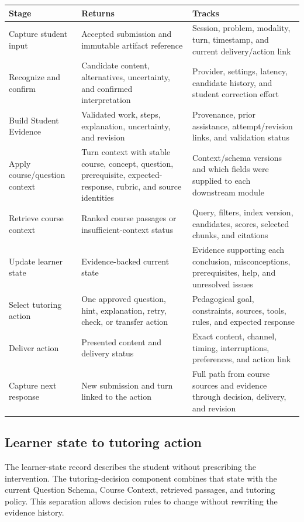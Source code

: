 \documentclass[11pt]{article}
\begin{document}
\noindent\begin{tabularx}{\textwidth}{@{}p{}p{}X@{}}
\toprule
\textbf{Stage} & \textbf{Returns} & \textbf{Tracks} \\
\midrule
Capture student input & Accepted submission and immutable artifact reference & Session, problem, modality, turn, timestamp, and current delivery/action link \\
Recognize and confirm & Candidate content, alternatives, uncertainty, and confirmed interpretation & Provider, settings, latency, candidate history, and student correction effort \\
Build Student Evidence & Validated work, steps, explanation, uncertainty, and revision & Provenance, prior assistance, attempt/revision links, and validation status \\
Apply course/question context & Turn context with stable course, concept, question, prerequisite, expected-response, rubric, and source identities & Context/schema versions and which fields were supplied to each downstream module \\
Retrieve course context & Ranked course passages or insufficient-context status & Query, filters, index version, candidates, scores, selected chunks, and citations \\
Update learner state & Evidence-backed current state & Evidence supporting each conclusion, misconceptions, prerequisites, help, and unresolved issues \\
Select tutoring action & One approved question, hint, explanation, retry, check, or transfer action & Pedagogical goal, constraints, sources, tools, rules, and expected response \\
Deliver action & Presented content and delivery status & Exact content, channel, timing, interruptions, preferences, and action link \\
Capture next response & New submission and turn linked to the action & Full path from course sources and evidence through decision, delivery, and revision \\
\bottomrule
\end{tabularx}

\subsection{Learner state to tutoring action}

The learner-state record describes the student without prescribing the intervention. The tutoring-decision component combines that state with the current Question Schema, Course Context, retrieved passages, and tutoring policy. This separation allows decision rules to change without rewriting the evidence history.
\end{document}
